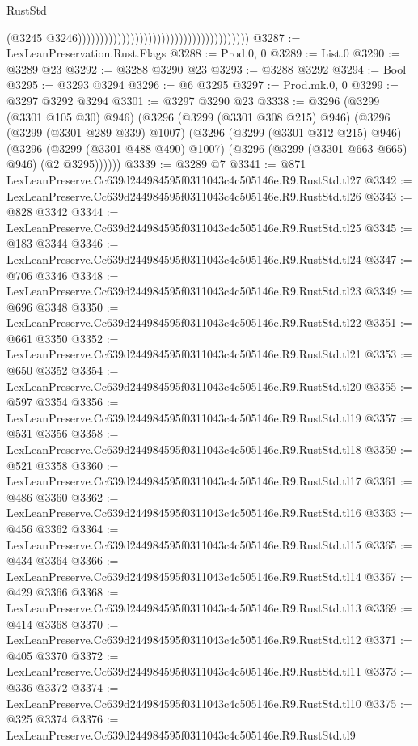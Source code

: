 \begin{lexlean}{RustStd}
\begin{coremodule}
                                                                                (@3245
                                                                                  @3246)))))))))))))))))))))))))))))))))))))))
@3287 := LexLeanPreservation.Rust.Flags
@3288 := Prod.{0, 0}
@3289 := List.{0}
@3290 := @3289 @23
@3292 := @3288 @3290 @23
@3293 := @3288 @3292
@3294 := Bool
@3295 := @3293 @3294
@3296 := @6 @3295
@3297 := Prod.mk.{0, 0}
@3299 := @3297 @3292 @3294
@3301 := @3297 @3290 @23
@3338 := @3296
    (@3299 (@3301 @105 @30) @946)
    (@3296
      (@3299 (@3301 @308 @215) @946)
      (@3296
        (@3299 (@3301 @289 @339) @1007)
        (@3296
          (@3299 (@3301 @312 @215) @946)
          (@3296
            (@3299 (@3301 @488 @490) @1007)
            (@3296 (@3299 (@3301 @663 @665) @946) (@2 @3295))))))
@3339 := @3289 @7
@3341 := @871 LexLeanPreserve.Cc639d244984595f0311043c4c505146e.R9.RustStd.tl27
@3342 := LexLeanPreserve.Cc639d244984595f0311043c4c505146e.R9.RustStd.tl26
@3343 := @828 @3342
@3344 := LexLeanPreserve.Cc639d244984595f0311043c4c505146e.R9.RustStd.tl25
@3345 := @183 @3344
@3346 := LexLeanPreserve.Cc639d244984595f0311043c4c505146e.R9.RustStd.tl24
@3347 := @706 @3346
@3348 := LexLeanPreserve.Cc639d244984595f0311043c4c505146e.R9.RustStd.tl23
@3349 := @696 @3348
@3350 := LexLeanPreserve.Cc639d244984595f0311043c4c505146e.R9.RustStd.tl22
@3351 := @661 @3350
@3352 := LexLeanPreserve.Cc639d244984595f0311043c4c505146e.R9.RustStd.tl21
@3353 := @650 @3352
@3354 := LexLeanPreserve.Cc639d244984595f0311043c4c505146e.R9.RustStd.tl20
@3355 := @597 @3354
@3356 := LexLeanPreserve.Cc639d244984595f0311043c4c505146e.R9.RustStd.tl19
@3357 := @531 @3356
@3358 := LexLeanPreserve.Cc639d244984595f0311043c4c505146e.R9.RustStd.tl18
@3359 := @521 @3358
@3360 := LexLeanPreserve.Cc639d244984595f0311043c4c505146e.R9.RustStd.tl17
@3361 := @486 @3360
@3362 := LexLeanPreserve.Cc639d244984595f0311043c4c505146e.R9.RustStd.tl16
@3363 := @456 @3362
@3364 := LexLeanPreserve.Cc639d244984595f0311043c4c505146e.R9.RustStd.tl15
@3365 := @434 @3364
@3366 := LexLeanPreserve.Cc639d244984595f0311043c4c505146e.R9.RustStd.tl14
@3367 := @429 @3366
@3368 := LexLeanPreserve.Cc639d244984595f0311043c4c505146e.R9.RustStd.tl13
@3369 := @414 @3368
@3370 := LexLeanPreserve.Cc639d244984595f0311043c4c505146e.R9.RustStd.tl12
@3371 := @405 @3370
@3372 := LexLeanPreserve.Cc639d244984595f0311043c4c505146e.R9.RustStd.tl11
@3373 := @336 @3372
@3374 := LexLeanPreserve.Cc639d244984595f0311043c4c505146e.R9.RustStd.tl10
@3375 := @325 @3374
@3376 := LexLeanPreserve.Cc639d244984595f0311043c4c505146e.R9.RustStd.tl9

\end{coremodule}
\end{lexlean}
